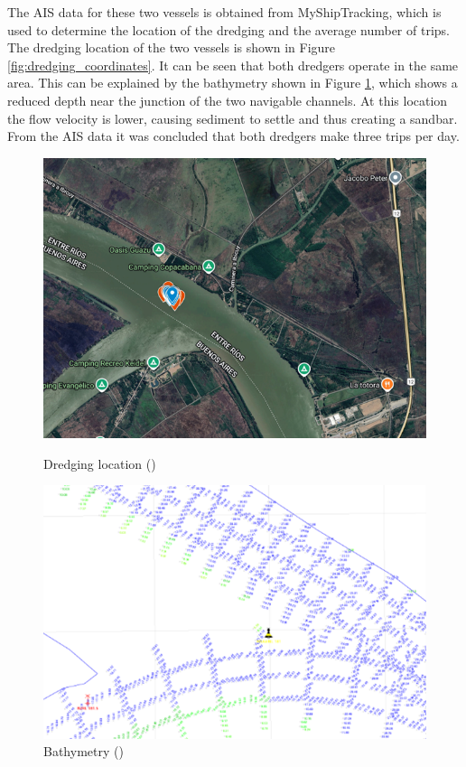The AIS data for these two vessels is obtained from MyShipTracking, which is used to determine the location of the dredging and the average number of trips. The dredging location of the two vessels is shown in Figure \ref{fig:dredging_coordinates}. It can be seen that both dredgers operate in the same area. This can be explained by the bathymetry shown in Figure \ref{fig:bathymetry}, which shows a reduced depth near the junction of the two navigable channels. At this location the flow velocity is lower, causing sediment to settle and thus creating a sandbar. From the AIS data it was concluded that both dredgers make three trips per day.

\begin{figure}[H]
    \centering
    \begin{minipage}{0.48\textwidth}
        \centering
        \includegraphics[width=\linewidth]{figures/ch5/Dredging_coordinates.png}
        \caption{Dredging location (\cite{googleearth2025})}
        \label{fig:dredging_coordinates}
    \end{minipage}\hfill
    \begin{minipage}{0.48\textwidth}
        \centering
        \includegraphics[width=\linewidth]{figures/ch5/Bathymetry.png}
        \caption{Bathymetry (\cite{agencianacionaldepuertosynavegacionNavegableTroncal2025})}
        \label{fig:bathymetry}
    \end{minipage}
\end{figure}

